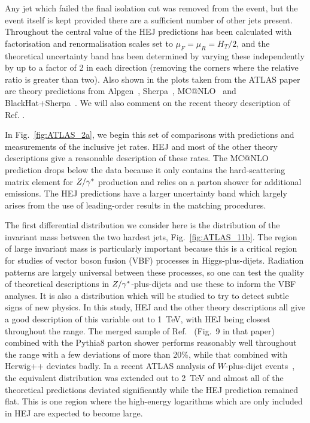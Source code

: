 			Any jet which failed the final isolation cut was removed from the event, but the
			event itself is kept provided there are a sufficient number of other jets
			present.  Throughout the central value of the HEJ predictions has been
			calculated with factorisation and renormalisation scales set to
			$\mu_F=\mu_R=H_T/2$, and the theoretical uncertainty band has been determined by
			varying these independently by up to a factor of 2 in each direction (removing
			the corners where the relative ratio is greater than two).  Also shown in the
			plots taken from the ATLAS paper are theory predictions from
			Alpgen~\cite{Mangano:2002ea}, Sherpa~\cite{Gleisberg:2008ta,Hoeche:2012yf},
			MC@NLO~\cite{Frixione:2002ik} and
			BlackHat+Sherpa~\cite{Berger:2010vm,Ita:2011wn}.  We will also comment on the
			recent theory description of Ref.\cite{Frederix:2015eii} .

			In Fig.~\ref{fig:ATLAS_2a}, we begin this set of comparisons with predictions
			and measurements of the inclusive jet rates.  HEJ and most of the other theory
			descriptions give a reasonable description of these rates.  The MC@NLO
			prediction drops below the data because it only contains the hard-scattering
			matrix element for $Z/\gamma^*$ production and relies on a parton shower for additional
			emissions. The HEJ predictions have a larger uncertainty band which largely
			arises from the use of leading-order results in the matching procedures.

			The first differential distribution we consider here is the distribution of the
			invariant mass between the two hardest jets, Fig.~\ref{fig:ATLAS_11b}.  The
			region of large invariant mass is particularly important because this is a
			critical region for studies of vector boson fusion (VBF) processes in
			Higgs-plus-dijets.  Radiation patterns are largely universal between these
			processes, so one can test the quality of theoretical descriptions in
			$Z/\gamma^*$-plus-dijets and use these to inform the VBF analyses.  It is also a
			distribution which will be studied to try to detect subtle signs of new physics.
			In this study, HEJ and the other theory descriptions all give a good description
			of this variable out to 1~TeV, with HEJ being closest throughout the range.  The
			merged sample of Ref.~\cite{Frederix:2015eii} (Fig.~9 in that paper) combined
			with the Pythia8 parton shower performs reasonably well throughout the range
			with a few deviations of more than 20\%, while that combined with Herwig++
			deviates badly.  In a recent ATLAS analysis of $W$-plus-dijet
			events~\cite{Aad:2014qxa}, the equivalent distribution was extended out to 2~TeV
			and almost all of the theoretical predictions deviated significantly while the
			HEJ prediction remained flat.  This is one region where the high-energy
			logarithms which are only included in HEJ are expected to become large.

